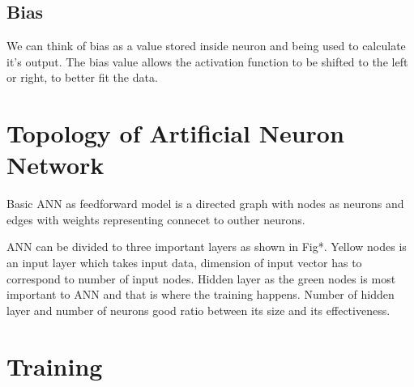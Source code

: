 \subsection{Bias}

We can think of bias as a value stored inside neuron and being used to calculate it's output.
The bias value allows the activation function to be shifted to the left or right, to better fit the data.


\section{Topology of Artificial Neuron Network}

Basic ANN as feedforward model is a directed graph with nodes as neurons and edges with weights representing connecet to outher neurons.


ANN can be divided to three important layers as shown in Fig*.
Yellow nodes is an input layer which takes input data, dimension of input vector has to correspond to number of input nodes.
Hidden layer as the green nodes is most important to ANN and that is where the training happens.
Number of hidden layer and number of neurons 
 good ratio between its size and its effectiveness.



\section{Training}
